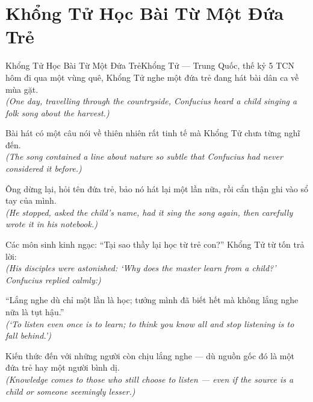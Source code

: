 \section{Khổng Tử Học Bài Từ Một Đứa Trẻ}
\begin{truyen}{Khổng Tử Học Bài Từ Một Đứa Trẻ}{Khổng Tử --- Trung Quốc, thế kỷ 5 TCN}
 hôm đi qua một vùng quê, Khổng Tử nghe một đứa trẻ đang hát bài dân ca về mùa gặt.\\[4pt]
\textit{(One day, travelling through the countryside, Confucius heard a child singing a folk song about the harvest.)}

Bài hát có một câu nói về thiên nhiên rất tinh tế mà Khổng Tử chưa từng nghĩ đến.\\[4pt]
\textit{(The song contained a line about nature so subtle that Confucius had never considered it before.)}

Ông dừng lại, hỏi tên đứa trẻ, bảo nó hát lại một lần nữa, rồi cẩn thận ghi vào sổ tay của mình.\\[4pt]
\textit{(He stopped, asked the child's name, had it sing the song again, then carefully wrote it in his notebook.)}

Các môn sinh kinh ngạc: ``Tại sao thầy lại học từ trẻ con?'' Khổng Tử từ tốn trả lời:\\[4pt]
\textit{(His disciples were astonished: `Why does the master learn from a child?' Confucius replied calmly:)}

``Lắng nghe dù chỉ một lần là học; tưởng mình đã biết hết mà không lắng nghe nữa là tụt hậu.''\\[4pt]
\textit{(`To listen even once is to learn; to think you know all and stop listening is to fall behind.')}

\end{truyen}
\begin{baihoc}
  Kiến thức đến với những người còn chịu lắng nghe --- dù nguồn gốc đó là một đứa trẻ hay một người bình dị.\\[4pt]
  \textit{(Knowledge comes to those who still choose to listen --- even if the source is a child or someone seemingly lesser.)}
\end{baihoc}

